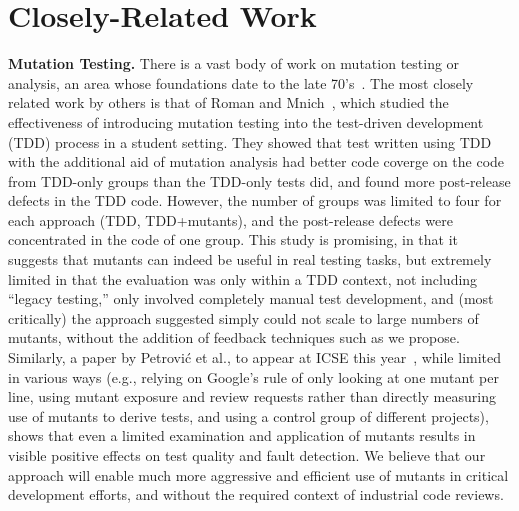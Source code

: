 \section{Closely-Related Work}

\noindent\textbf{Mutation Testing.}
%
There is a vast body of work on mutation testing or analysis, an area whose foundations date
to the late 70's~\cite{demillo1978hints,budd1980theoretical}.  
The most closely related work by others is that of Roman and
Mnich~\cite{tddmut}, which studied the effectiveness of introducing
mutation testing into the test-driven development (TDD) process in a
student setting.  They showed that test written using TDD with the
additional aid of mutation analysis had better code coverge on the
code from TDD-only groups than the TDD-only tests did, and found more
post-release defects in the TDD code.  However, the number of groups
was limited to four for each approach (TDD, TDD+mutants), and the
post-release defects were concentrated in the code of one group.  This
study is promising, in that it suggests that mutants can indeed be
useful in real testing tasks, but extremely limited in that the
evaluation was only within a TDD context, not including ``legacy
testing,'' only involved completely manual test development, and (most
critically) the approach suggested simply could not scale to large
numbers of mutants, without the addition of feedback techniques such
as we propose.   Similarly, a paper by Petrovi\'c et al., to appear at ICSE this
year~\cite{MutImpTest}, while limited in various ways (e.g., relying on Google's rule of only looking at one
mutant per line, using mutant exposure and review requests rather than
directly measuring use of mutants to derive tests, and using a control group of different projects), shows that even a limited examination and
application of mutants results in
visible positive effects on test quality and fault detection.  We
believe that our approach will enable much more aggressive and efficient use of
mutants in critical development efforts, and without the required
context of industrial code reviews.

